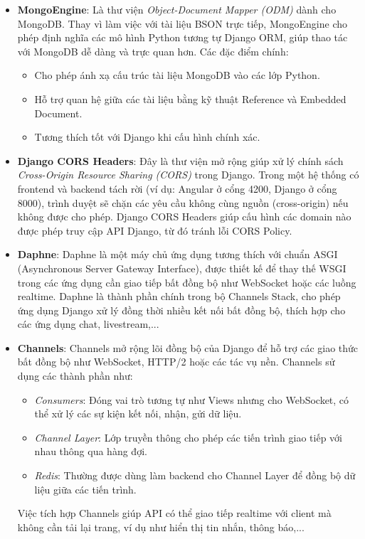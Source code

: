 \begin{itemize}
    \item \textbf{MongoEngine}:
    Là thư viện \textit{Object-Document Mapper (ODM)} dành cho MongoDB. Thay vì làm việc với tài liệu BSON trực tiếp, MongoEngine cho phép định nghĩa các mô hình Python tương tự Django ORM, giúp thao tác với MongoDB dễ dàng và trực quan hơn. Các đặc điểm chính:
    \begin{itemize}
        \item Cho phép ánh xạ cấu trúc tài liệu MongoDB vào các lớp Python.
        \item Hỗ trợ quan hệ giữa các tài liệu bằng kỹ thuật Reference và Embedded Document.
        \item Tương thích tốt với Django khi cấu hình chính xác.
    \end{itemize}

    \item \textbf{Django CORS Headers}:
    Đây là thư viện mở rộng giúp xử lý chính sách \textit{Cross-Origin Resource Sharing (CORS)} trong Django. Trong một hệ thống có frontend và backend tách rời (ví dụ: Angular ở cổng 4200, Django ở cổng 8000), trình duyệt sẽ chặn các yêu cầu không cùng nguồn (cross-origin) nếu không được cho phép. Django CORS Headers giúp cấu hình các domain nào được phép truy cập API Django, từ đó tránh lỗi CORS Policy.
    
    \item \textbf{Daphne}:
    Daphne là một máy chủ ứng dụng tương thích với chuẩn ASGI (Asynchronous Server Gateway Interface), được thiết kế để thay thế WSGI trong các ứng dụng cần giao tiếp bất đồng bộ như WebSocket hoặc các luồng realtime. Daphne là thành phần chính trong bộ Channels Stack, cho phép ứng dụng Django xử lý đồng thời nhiều kết nối bất đồng bộ, thích hợp cho các ứng dụng chat, livestream,...

    \item \textbf{Channels}:
    Channels mở rộng lõi đồng bộ của Django để hỗ trợ các giao thức bất đồng bộ như WebSocket, HTTP/2 hoặc các tác vụ nền. Channels sử dụng các thành phần như:
    \begin{itemize}
        \item \textit{Consumers}: Đóng vai trò tương tự như Views nhưng cho WebSocket, có thể xử lý các sự kiện kết nối, nhận, gửi dữ liệu.
        \item \textit{Channel Layer}: Lớp truyền thông cho phép các tiến trình giao tiếp với nhau thông qua hàng đợi.
        \item \textit{Redis}: Thường được dùng làm backend cho Channel Layer để đồng bộ dữ liệu giữa các tiến trình.
    \end{itemize}
    Việc tích hợp Channels giúp API có thể giao tiếp realtime với client mà không cần tải lại trang, ví dụ như hiển thị tin nhắn, thông báo,...


\end{itemize}
